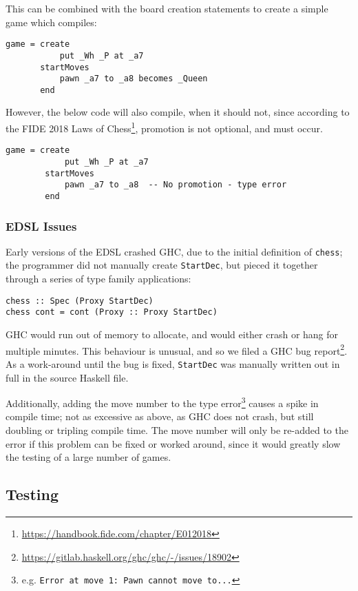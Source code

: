 \documentclass[12pt, a4paper]{scrartcl}
\begin{document}
This can be combined with the board creation statements to create a simple game which compiles:

\begin{lstlisting}
game = create
           put _Wh _P at _a7
       startMoves
           pawn _a7 to _a8 becomes _Queen
       end
\end{lstlisting}

However, the below code will also compile, when it should not, since according to the FIDE 2018 Laws of Chess\footnote{\url{https://handbook.fide.com/chapter/E012018}}, promotion is not optional, and must occur.

\begin{lstlisting}
game = create
            put _Wh _P at _a7
        startMoves
            pawn _a7 to _a8  -- No promotion - type error
        end
\end{lstlisting}

\subsubsection{EDSL Issues}

Early versions of the EDSL crashed GHC, due to the initial definition of \lstinline{chess}; the programmer did not manually create \lstinline{StartDec}, but pieced it together through a series of type family applications:

\begin{lstlisting}
chess :: Spec (Proxy StartDec)
chess cont = cont (Proxy :: Proxy StartDec)
\end{lstlisting}

GHC would run out of memory to allocate, and would either crash or hang for multiple minutes. This behaviour is unusual, and so we filed a GHC bug report\footnote{\url{https://gitlab.haskell.org/ghc/ghc/-/issues/18902}}. As a work-around until the bug is fixed, \lstinline{StartDec} was manually written out in full in the source Haskell file.

Additionally, adding the move number to the type error\footnote{e.g. \lstinline{Error at move 1: Pawn cannot move to...}} causes a spike in compile time; not as excessive as above, as GHC does not crash, but still doubling or tripling compile time. The move number will only be re-added to the error if this problem can be fixed or worked around, since it would greatly slow the testing of a large number of games.

\subsection{Testing}
\end{document}
